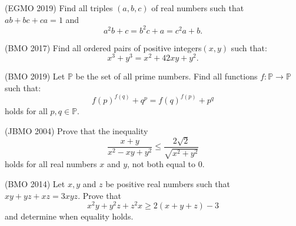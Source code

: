 \documentclass[12pt]{scrartcl}
\begin{document}
        \begin{soalbaru}(EGMO 2019)
    Find all triples $(a, b, c)$ of real numbers such that $ab + bc + ca = 1$ and $$a^2b + c = b^2c + a = c^2a + b.$$
    \end{soalbaru}
    
    \begin{soalbaru}(BMO 2017)
    Find all ordered pairs of positive integers$ (x, y)$ such that:$$x^3+y^3=x^2+42xy+y^2.$$
    \end{soalbaru}
    
    
    \begin{soalbaru}(BMO 2019)
    Let $\mathbb{P}$ be the set of all prime numbers. Find all functions $f:\mathbb{P}\rightarrow\mathbb{P}$ such that:
$$f(p)^{f(q)}+q^p=f(q)^{f(p)}+p^q$$holds for all $p,q\in\mathbb{P}$.
    \end{soalbaru}

    
    \begin{soalbaru}(JBMO 2004)
    Prove that the inequality\[ \frac{ x+y}{x^2-xy+y^2 } \leq \frac{ 2\sqrt 2 }{\sqrt{ x^2 +y^2 } } \]holds for all real numbers $x$ and $y$, not both equal to 0.
    \end{soalbaru}
    
    \begin{soalbaru}(BMO 2014)
    Let $x,y$ and $z$ be positive real numbers such that $xy+yz+xz=3xyz$. Prove that\[ x^2y+y^2z+z^2x \ge 2(x+y+z)-3 \]and determine when equality holds.
    \end{soalbaru}
\end{document}
